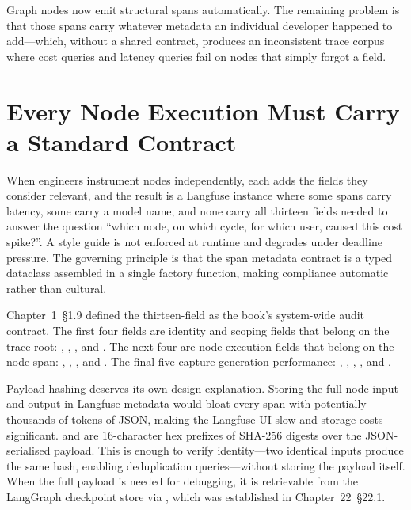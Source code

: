 Graph nodes now emit structural spans automatically. The remaining
problem is that those spans carry whatever metadata an individual developer
happened to add---which, without a shared contract, produces an
inconsistent trace corpus where cost queries and latency queries fail on
nodes that simply forgot a field.


\section{Every Node Execution Must Carry a Standard Contract}
\label{sec:obs-cycle-record}

When engineers instrument nodes independently, each adds the fields they
consider relevant, and the result is a Langfuse instance where some
spans carry latency, some carry a model name, and none carry all
thirteen fields needed to answer the question ``which node, on which
cycle, for which user, caused this cost spike?''. A style guide is not
enforced at runtime and degrades under deadline pressure. The governing
principle is that the span metadata contract is a typed dataclass
assembled in a single factory function, making compliance automatic
rather than cultural.

Chapter~1~\S1.9 defined the thirteen-field 
as the book's system-wide audit contract. The first four fields are
identity and scoping fields that belong on the trace root:
, , , and
. The next four are node-execution fields that belong on
the node span: , ,
, and . The final five
capture generation performance: , ,
, , and .

Payload hashing deserves its own design explanation. Storing the full
node input and output in Langfuse metadata would bloat every span with
potentially thousands of tokens of JSON, making the Langfuse UI slow
and storage costs significant.  and
 are 16-character hex prefixes of SHA-256
digests over the JSON-serialised payload. This is enough to verify
identity---two identical inputs produce the same hash, enabling
deduplication queries---without storing the payload itself. When the
full payload is needed for debugging, it is retrievable from the
LangGraph checkpoint store via , which
was established in Chapter~22~\S22.1.

